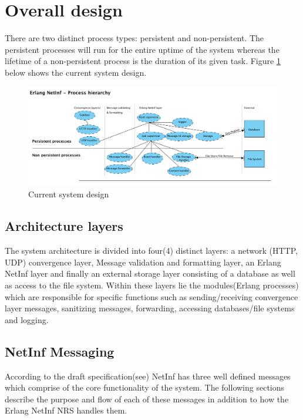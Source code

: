 \section {Overall design}

There are two distinct process types: persistent and non-persistent. The persistent processes will run for the entire uptime of the system whereas the lifetime of a non-persistent process is the duration of its given task. Figure \ref{fig:processhi} below shows the current system design.

\begin{figure}[H]
	\centering
\centerline{\includegraphics[width=1.2\textwidth]{./img/process_hierarchy.png}}
\caption{Current system design}
\label{fig:processhi}
\end{figure}

\subsection{Architecture layers}

The system architecture is divided into four(4) distinct layers: a network (HTTP, UDP) convergence layer, Message validation and formatting layer, an Erlang NetInf layer and finally an external storage layer consisting of a database as well as access to the file system. Within these layers lie the modules(Erlang processes) which are responsible for specific functions such as sending/receiving convergence layer messages, sanitizing messages, forwarding, accessing databases/file systems and logging.

\subsection{NetInf Messaging}

According to the draft specification(see\cite{netinfproto}) NetInf has three well defined messages which comprise of the core functionality of the system. The following sections describe the purpose and flow of each of these messages in addition to how the Erlang NetInf NRS handles them.

